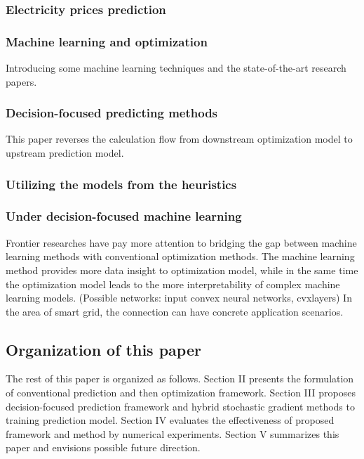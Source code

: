\documentclass[journal]{IEEEtran}
\begin{document}
\subsubsection{Electricity prices prediction}

\subsubsection{Machine learning and optimization}

Introducing some machine learning techniques and the state-of-the-art research papers.

\subsubsection{Decision-focused predicting methods}
This paper reverses the calculation flow from downstream optimization model to upstream prediction model.

\subsubsection{Utilizing the models from the heuristics}

\subsubsection{Under decision-focused machine learning}
Frontier researches have pay more attention to bridging the gap between machine learning methods with conventional optimization methods. The machine learning method provides more data insight to optimization model, while in the same time the optimization model leads to the more interpretability of complex machine learning models. (Possible networks: input convex neural networks, cvxlayers) In the area of smart grid, the connection can have concrete application scenarios.

\subsection{Organization of this paper}
The rest of this paper is organized as follows. Section II presents the formulation of conventional prediction and then optimization framework. Section III proposes decision-focused prediction framework and hybrid stochastic gradient methods to training prediction model. Section IV evaluates the effectiveness of proposed framework and method by numerical experiments. Section V summarizes this paper and envisions possible future direction.
\end{document}
